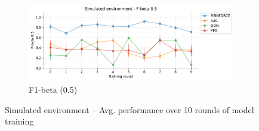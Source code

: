 \documentclass[a4paper, 12pt]{article}
\begin{document}
\begin{figure}[ht]
	\begin{subfigure}{\textwidth}
		\centering
		\includegraphics[width=\linewidth]{Simulated_F05.pdf}  
		\caption{F1-beta (0.5)}
		\label{fig:tr-sim-f05}
	\end{subfigure}
	\caption{Simulated environment -- Avg. performance over 10 rounds of model training}
	\label{fig:tr-sim-env}
\end{figure}
\end{document}
